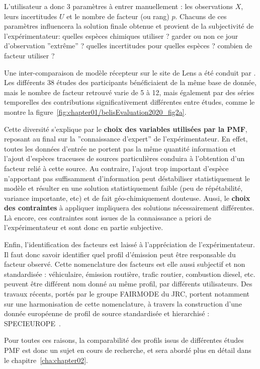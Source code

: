 L'utilisateur a donc 3 paramètres à entrer manuellement : les observations $X$, leurs
incertitudes $U$ et le nombre de facteur (ou rang) $p$. Chacuns de ces paramètres
influencera la solution finale obtenue et provient de la subjectivité de l'expérimentateur:
quelles espèces chimiques utiliser ? garder ou non ce jour d'observation ''extrême'' ?
quelles incertitudes pour quelles espèces ? combien de facteur utiliser ?

Une inter-comparaison de modèle récepteur sur le site de Lens a été conduit par
\textcite{belisEvaluation2020}. Les différents 38 études des participants bénéficiaient de
la même base de donnée, mais le nombre de facteur retrouvé varie de 5 à 12, mais également
par des séries temporelles des contributions significativement différentes entre études,
comme le montre la figure~\ref{fig:chapter01/belisEvaluation2020_fig2a}.

Cette diversité s'explique par le \textbf{choix des variables utilisées par la PMF}, reposant au
final sur la ''connaissance d'expert'' de l'expérimentateur. En effet, toutes les données
d'entrée ne portent pas la même quantité information et l'ajout d'espèces traceuses de
sources particulières conduira à l'obtention d'un facteur relié à cette source. Au
contraire, l'ajout trop important d'espèce n'apportant pas suffisamment d'information peut
déstabiliser statistiquement le modèle et résulter en une solution statistiquement faible
(peu de répétabilité, variance importante, etc) et de fait géo-chimiquement douteuse.
Aussi, le \textbf{choix des contraintes} à appliquer impliquera des solutions
nécessairement différentes. Là encore, ces contraintes sont issues de la connaissance a
priori de l'expérimentateur et sont donc en partie subjective.

Enfin, l'identification des facteurs est laissé à l'appréciation de l'expérimentateur. Il
faut donc savoir identifier quel profil d'émission peut être responsable du facteur
observé. Cette nomenclature des facteurs est elle aussi subjectif et non standardisée :
véhiculaire, émission routière, trafic routier, combustion diesel, etc. peuvent être
différent nom donné au même profil, par différents utilisateurs.
Des travaux récents, portés par le groupe FAIRMODE du JRC, portent notamment sur une
harmonisation de cette nomenclature, à travers la construction d'une donnée européenne de
profil de source standardisée et hierarchisé : SPECIEUROPE~\autocite{pernigottiSPECIEUROPE2016}.

Pour toutes ces raisons, la comparabilité des profils issus de différentes études PMF
est donc un sujet en cours de recherche, et sera abordé plus en détail dans le
chapitre~\ref{cha:chapter02}.

